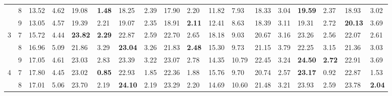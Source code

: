 \documentclass[conference]{IEEEtran}
\begin{document}
\begin{table*}[]
\begin{tabular}{|cl|ll|ll|ll|ll|ll|ll|ll|ll|}
		\multicolumn{1}{|c|}{} & 8 & \multicolumn{1}{l|}{13.52} & 4.62 & \multicolumn{1}{l|}{19.08} & \textbf{1.48} & \multicolumn{1}{l|}{18.25} & 2.39 & \multicolumn{1}{l|}{17.90} & 2.20 & \multicolumn{1}{l|}{11.82} & 7.93 & \multicolumn{1}{l|}{18.33} & 3.04 & \multicolumn{1}{l|}{\textbf{19.59}} & 2.37 & \multicolumn{1}{l|}{18.93} & 3.02 \\ \cline{2-18} 
		\multicolumn{1}{|c|}{} & 9 & \multicolumn{1}{l|}{13.05} & 4.57 & \multicolumn{1}{l|}{19.39} & 2.21 & \multicolumn{1}{l|}{19.07} & 2.35 & \multicolumn{1}{l|}{18.91} & \textbf{2.11} & \multicolumn{1}{l|}{12.41} & 8.63 & \multicolumn{1}{l|}{18.39} & 3.11 & \multicolumn{1}{l|}{19.31} & 2.72 & \multicolumn{1}{l|}{\textbf{20.13}} & 3.69 \\ \hline
		\multicolumn{1}{|c|}{\multirow{3}{*}{3}} & 7 & \multicolumn{1}{l|}{15.72} & 4.44 & \multicolumn{1}{l|}{\textbf{23.82}} & \textbf{2.29} & \multicolumn{1}{l|}{22.87} & 2.59 & \multicolumn{1}{l|}{22.70} & 2.65 & \multicolumn{1}{l|}{18.18} & 9.03 & \multicolumn{1}{l|}{20.67} & 3.16 & \multicolumn{1}{l|}{23.26} & 2.56 & \multicolumn{1}{l|}{22.07} & 2.61 \\ \cline{2-18} 
		\multicolumn{1}{|c|}{} & 8 & \multicolumn{1}{l|}{16.96} & 5.09 & \multicolumn{1}{l|}{21.86} & 3.29 & \multicolumn{1}{l|}{\textbf{23.04}} & 3.26 & \multicolumn{1}{l|}{21.83} & \textbf{2.48} & \multicolumn{1}{l|}{15.30} & 9.73 & \multicolumn{1}{l|}{21.15} & 3.79 & \multicolumn{1}{l|}{22.25} & 3.15 & \multicolumn{1}{l|}{21.36} & 3.03 \\ \cline{2-18} 
		\multicolumn{1}{|c|}{} & 9 & \multicolumn{1}{l|}{17.05} & 4.61 & \multicolumn{1}{l|}{23.03} & 2.83 & \multicolumn{1}{l|}{23.39} & 3.22 & \multicolumn{1}{l|}{23.07} & 2.78 & \multicolumn{1}{l|}{14.35} & 10.79 & \multicolumn{1}{l|}{22.45} & 3.24 & \multicolumn{1}{l|}{\textbf{24.50}} & \textbf{2.72} & \multicolumn{1}{l|}{22.91} & 3.69 \\ \hline
		\multicolumn{1}{|c|}{\multirow{3}{*}{4}} & 7 & \multicolumn{1}{l|}{17.80} & 4.45 & \multicolumn{1}{l|}{23.02} & \textbf{0.85} & \multicolumn{1}{l|}{22.93} & 1.85 & \multicolumn{1}{l|}{22.36} & 1.88 & \multicolumn{1}{l|}{15.76} & 9.70 & \multicolumn{1}{l|}{20.74} & 2.57 & \multicolumn{1}{l|}{\textbf{23.17}} & 0.92 & \multicolumn{1}{l|}{22.87} & 1.53 \\ \cline{2-18} 
		\multicolumn{1}{|c|}{} & 8 & \multicolumn{1}{l|}{17.01} & 5.06 & \multicolumn{1}{l|}{23.70} & 2.19 & \multicolumn{1}{l|}{\textbf{24.10}} & 2.19 & \multicolumn{1}{l|}{23.29} & 2.20 & \multicolumn{1}{l|}{14.69} & 10.60 & \multicolumn{1}{l|}{21.48} & 3.21 & \multicolumn{1}{l|}{23.93} & 2.59 & \multicolumn{1}{l|}{23.78} & \textbf{2.04} \\ \cline{2-18} 

\end{tabular}
\end{table*}
\end{document}
